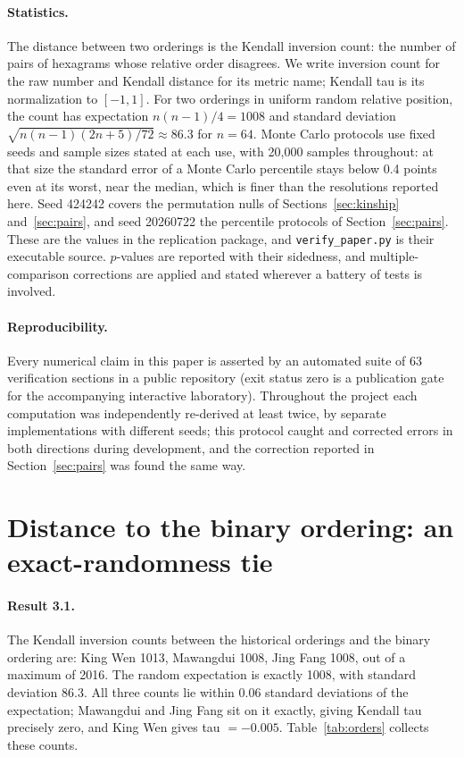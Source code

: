 \documentclass[11pt]{article}
\begin{document}
\paragraph{Statistics.} The distance between two orderings is the Kendall inversion count: the number of pairs of hexagrams whose relative order disagrees. We write inversion count for the raw number and Kendall distance for its metric name; Kendall tau is its normalization to $[-1, 1]$. For two orderings in uniform random relative position, the count has expectation $n(n-1)/4 = 1008$ and standard deviation $\sqrt{n(n-1)(2n+5)/72} \approx 86.3$ for $n = 64$. Monte Carlo protocols use fixed seeds and sample sizes stated at each use, with 20,000 samples throughout: at that size the standard error of a Monte Carlo percentile stays below 0.4 points even at its worst, near the median, which is finer than the resolutions reported here. Seed 424242 covers the permutation nulls of Sections~\ref{sec:kinship} and~\ref{sec:pairs}, and seed 20260722 the percentile protocols of Section~\ref{sec:pairs}. These are the values in the replication package, and \texttt{verify\_paper.py} is their executable source. $p$-values are reported with their sidedness, and multiple-comparison corrections are applied and stated wherever a battery of tests is involved.

\paragraph{Reproducibility.} Every numerical claim in this paper is asserted by an automated suite of 63 verification sections in a public repository (exit status zero is a publication gate for the accompanying interactive laboratory). Throughout the project each computation was independently re-derived at least twice, by separate implementations with different seeds; this protocol caught and corrected errors in both directions during development, and the correction reported in Section~\ref{sec:pairs} was found the same way.

\section{Distance to the binary ordering: an exact-randomness tie}
\label{sec:distance}

\paragraph{Result 3.1.} The Kendall inversion counts between the historical orderings and the binary ordering are: King Wen 1013, Mawangdui 1008, Jing Fang 1008, out of a maximum of 2016. The random expectation is exactly 1008, with standard deviation 86.3. All three counts lie within 0.06 standard deviations of the expectation; Mawangdui and Jing Fang sit on it exactly, giving Kendall tau precisely zero, and King Wen gives tau $= -0.005$. Table~\ref{tab:orders} collects these counts.
\end{document}

